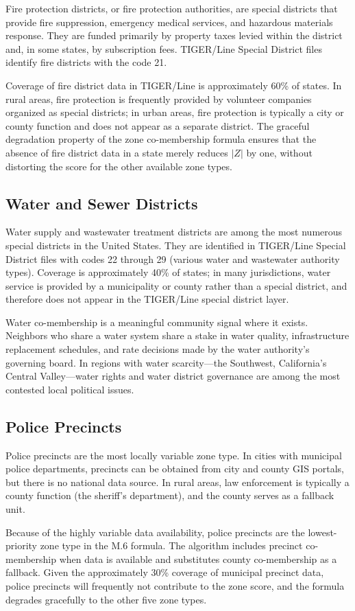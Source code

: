 Fire protection districts, or fire protection authorities, are special districts that
provide fire suppression, emergency medical services, and hazardous materials response.
They are funded primarily by property taxes levied within the district and, in some
states, by subscription fees.
TIGER/Line Special District files identify fire districts with the code 21.

Coverage of fire district data in TIGER/Line is approximately 60\% of states.
In rural areas, fire protection is frequently provided by volunteer companies organized
as special districts; in urban areas, fire protection is typically a city or county
function and does not appear as a separate district.
The graceful degradation property of the zone co-membership formula ensures that
the absence of fire district data in a state merely reduces $|Z|$ by one, without
distorting the score for the other available zone types.

\subsection{Water and Sewer Districts}

Water supply and wastewater treatment districts are among the most numerous special
districts in the United States.
They are identified in TIGER/Line Special District files with codes 22 through 29
(various water and wastewater authority types).
Coverage is approximately 40\% of states; in many jurisdictions, water service is
provided by a municipality or county rather than a special district, and therefore
does not appear in the TIGER/Line special district layer.

Water co-membership is a meaningful community signal where it exists.
Neighbors who share a water system share a stake in water quality, infrastructure
replacement schedules, and rate decisions made by the water authority's governing
board.
In regions with water scarcity---the Southwest, California's Central Valley---water
rights and water district governance are among the most contested local political
issues.

\subsection{Police Precincts}

Police precincts are the most locally variable zone type.
In cities with municipal police departments, precincts can be obtained from city and
county GIS portals, but there is no national data source.
In rural areas, law enforcement is typically a county function (the sheriff's
department), and the county serves as a fallback unit.

Because of the highly variable data availability, police precincts are the
lowest-priority zone type in the M.6 formula.
The algorithm includes precinct co-membership when data is available and substitutes
county co-membership as a fallback.
Given the approximately 30\% coverage of municipal precinct data, police precincts
will frequently not contribute to the zone score, and the formula degrades gracefully
to the other five zone types.
